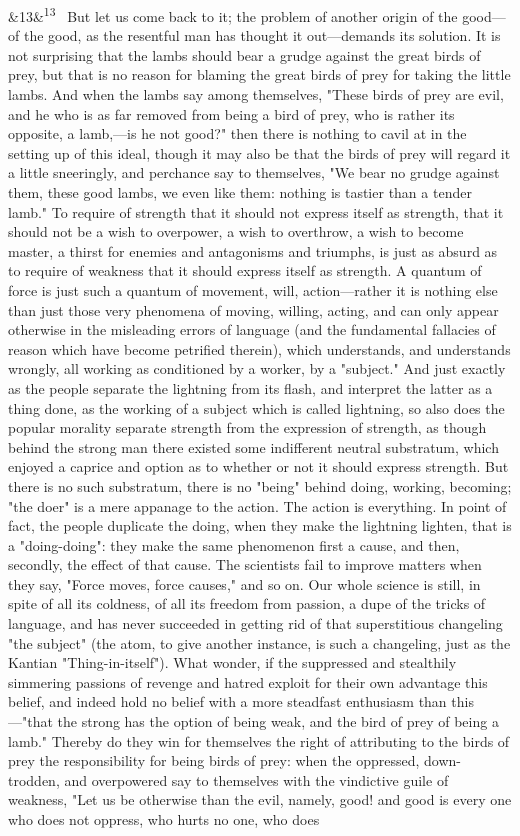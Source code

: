 \documentclass[12pt]{article}
\newcommand{\para}[1][]{\par\noindent\ifx&#1&\else\textsuperscript{\footnotesize #1}~\fi}
\begin{document}
\para[13] But let us come back to it; the problem of another origin of the good---of the good, as the resentful man has thought it out---demands its solution. It is not surprising that the lambs should bear a grudge against the great birds of prey, but that is no reason for blaming the great birds of prey for taking the little lambs. And when the lambs say among themselves, "These birds of prey are evil, and he who is as far removed from being a bird of prey, who is rather its opposite, a lamb,---is he not good?" then there is nothing to cavil at in the setting up of this ideal, though it may also be that the birds of prey will regard it a little sneeringly, and perchance say to themselves, "We bear no grudge against them, these good lambs, we even like them: nothing is tastier than a tender lamb." To require of strength that it should not express itself as strength, that it should not be a wish to overpower, a wish to overthrow, a wish to become master, a thirst for enemies and antagonisms and triumphs, is just as absurd as to require of weakness that it should express itself as strength. A quantum of force is just such a quantum of movement, will, action---rather it is nothing else than just those very phenomena of moving, willing, acting, and can only appear otherwise in the misleading errors of language (and the fundamental fallacies of reason which have become petrified therein), which understands, and understands wrongly, all working as conditioned by a worker, by a "subject." And just exactly as the people separate the lightning from its flash, and interpret the latter as a thing done, as the working of a subject which is called lightning, so also does the popular morality separate strength from the expression of strength, as though behind the strong man there existed some indifferent neutral substratum, which enjoyed a caprice and option as to whether or not it should express strength. But there is no such substratum, there is no "being" behind doing, working, becoming; "the doer" is a mere appanage to the action. The action is everything. In point of fact, the people duplicate the doing, when they make the lightning lighten, that is a "doing-doing": they make the same phenomenon first a cause, and then, secondly, the effect of that cause. The scientists fail to improve matters when they say, "Force moves, force causes," and so on. Our whole science is still, in spite of all its coldness, of all its freedom from passion, a dupe of the tricks of language, and has never succeeded in getting rid of that superstitious changeling "the subject" (the atom, to give another instance, is such a changeling, just as the Kantian "Thing-in-itself"). What wonder, if the suppressed and stealthily simmering passions of revenge and hatred exploit for their own advantage this belief, and indeed hold no belief with a more steadfast enthusiasm than this---"that the strong has the option of being weak, and the bird of prey of being a lamb." Thereby do they win for themselves the right of attributing to the birds of prey the responsibility for being birds of prey: when the oppressed, down-trodden, and overpowered say to themselves with the vindictive guile of weakness, "Let us be otherwise than the evil, namely, good! and good is every one who does not oppress, who hurts no one, who does 
\end{document}
